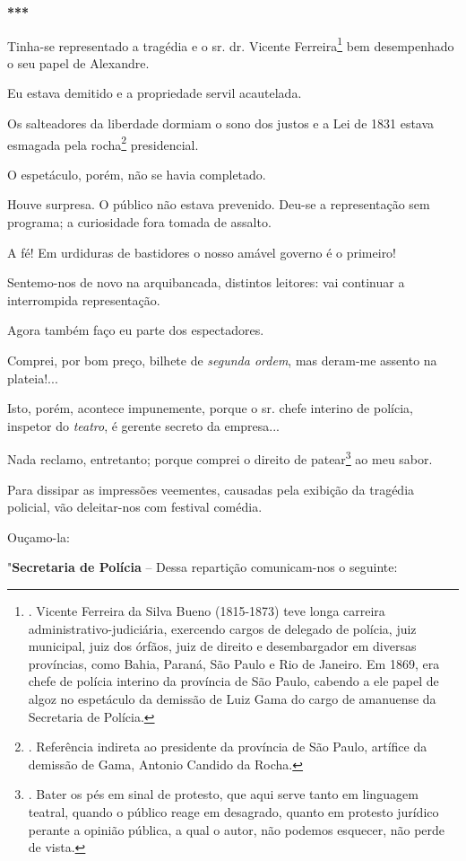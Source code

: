 \textbf{***}

Tinha-se representado a tragédia e o sr. dr. Vicente Ferreira\footnote{.
  Vicente Ferreira da Silva Bueno (1815-1873) teve longa carreira
  administrativo-judiciária, exercendo cargos de delegado de polícia,
  juiz municipal, juiz dos órfãos, juiz de direito e desembargador em
  diversas províncias, como Bahia, Paraná, São Paulo e Rio de Janeiro.
  Em 1869, era chefe de polícia interino da província de São Paulo,
  cabendo a ele papel de algoz no espetáculo da demissão de Luiz Gama do
  cargo de amanuense da Secretaria de Polícia.} bem desempenhado o seu
papel de Alexandre.

Eu estava demitido e a propriedade servil acautelada.

Os salteadores da liberdade dormiam o sono dos justos e a Lei de 1831
estava esmagada pela rocha\footnote{. Referência indireta ao presidente
  da província de São Paulo, artífice da demissão de Gama, Antonio
  Candido da Rocha.} presidencial.

O espetáculo, porém, não se havia completado.

Houve surpresa. O público não estava prevenido. Deu-se a representação
sem programa; a curiosidade fora tomada de assalto.

A fé! Em urdiduras de bastidores o nosso amável governo é o primeiro!

Sentemo-nos de novo na arquibancada, distintos leitores: vai continuar a
interrompida representação.

Agora também faço eu parte dos espectadores.

Comprei, por bom preço, bilhete de \emph{segunda ordem}, mas deram-me
assento na plateia!...

Isto, porém, acontece impunemente, porque o sr. chefe interino de
polícia, inspetor do \emph{teatro}, é gerente secreto da empresa...

Nada reclamo, entretanto; porque comprei o direito de patear\footnote{.
  Bater os pés em sinal de protesto, que aqui serve tanto em linguagem
  teatral, quando o público reage em desagrado, quanto em protesto
  jurídico perante a opinião pública, a qual o autor, não podemos
  esquecer, não perde de vista.} ao meu sabor.

Para dissipar as impressões veementes, causadas pela exibição da
tragédia policial, vão deleitar-nos com festival comédia.

Ouçamo-la:

"\textbf{Secretaria de Polícia} -- Dessa repartição comunicam-nos o
seguinte:

